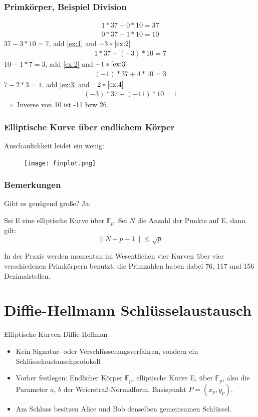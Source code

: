 \documentclass{beamer}
\newcommand{\F}{\mathbb{F}}
\begin{document}
\begin{frame}
  \frametitle{Primkörper, Beispiel Division}
  \vspace*{-1cm}
  \begin{eqnarray}
    1 * 37 + 0 * 10 = 37  \label{ex:1} \\
    0 * 37 + 1 * 10 = 10  \label{ex:2}
  \end{eqnarray}
  $37 - 3 * 10 = 7$, add \eqref{ex:1} and $-3 * \eqref{ex:2}$
  \begin{eqnarray}
    1 *37 + (-3) * 10 = 7 \label{ex:3}
  \end{eqnarray}
  $10 - 1 * 7 = 3$, add \eqref{ex:2} and $-1 * \eqref{ex:3}$
  \begin{eqnarray}
    (-1) * 37 + 4 * 10 = 3 \label{ex:4}
  \end{eqnarray}
  $7 - 2*3 = 1$, add \eqref{ex:3} and $-2 * \eqref{ex:4}$
  \begin{eqnarray}
    (-3) * 37 + (-11) * 10 = 1
  \end{eqnarray}
  $\Rightarrow$ Inverse von 10 ist -11 bzw 26.
\end{frame}

\begin{frame}
  \frametitle{Elliptische Kurve über endlichem Körper}
  Anschaulichkeit leidet ein wenig:
  \begin{figure}
    \texttt{[image: finplot.png]}
  \end{figure}
\end{frame}
\begin{frame}
  \frametitle{Bemerkungen}
  Gibt es genügend große? Ja:
  \begin{theorem}
    Sei E eine elliptische Kurve über $\F_p$. Sei $N$ die Anzahl der Punkte
    auf E, dann gilt:
    \begin{equation}
      \| N - p - 1 \| \le \sqrt{p}
    \end{equation}
  \end{theorem}
  In der Praxis werden momentan im Wesentlichen vier Kurven über vier
  verschiedenen Primkörpern benutzt, die Primzahlen haben dabei 76, 117 und
  156 Dezimalstellen.
\end{frame}


\section{Diffie-Hellmann Schlüsselaustausch}

\begin{frame}
  Elliptische Kurven Diffie-Hellman
  \begin{itemize}
  \item Kein Signatur- oder Verschlüsselungsverfahren, sondern ein
    Schlüsselaustauschprotokoll
  \item Vorher festlegen: Endlicher Körper $\F_p$, elliptische Kurve E, über
    $\F_p$, also die Parameter $a$, $b$ der Weierstraß-Normalform, Basispunkt
    $P = (x_p, y_p)$.
  \item Am Schluss besitzen Alice und Bob denselben gemeinsamen Schlüssel.
  \end{itemize}
\end{frame}
\end{document}
